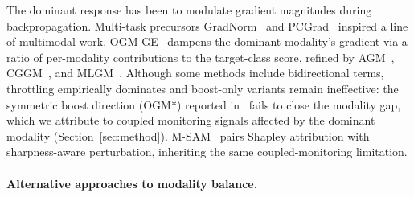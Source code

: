 \documentclass{article} %
\begin{document}
The dominant response has been to modulate gradient magnitudes during backpropagation. Multi-task precursors GradNorm~\citep{chen2018gradnorm} and PCGrad~\citep{yu2020pcgrad} inspired a line of multimodal work. OGM-GE~\citep{peng2022ogmge} dampens the dominant modality's gradient via a ratio of per-modality contributions to the target-class score, refined by AGM~\citep{li2023agm}, CGGM~\citep{guo2024cggm}, and MLGM~\citep{kontras2024mlgm}. Although some methods include bidirectional terms, throttling empirically dominates and boost-only variants remain ineffective: the symmetric boost direction (OGM*) reported in~\citet{wei2024opm} fails to close the modality gap, which we attribute to coupled monitoring signals affected by the dominant modality (Section~\ref{sec:method}). M-SAM~\citep{nowdeh2025msam} pairs Shapley attribution with sharpness-aware perturbation, inheriting the same coupled-monitoring limitation.


\paragraph{Alternative approaches to modality balance.}
\end{document}
